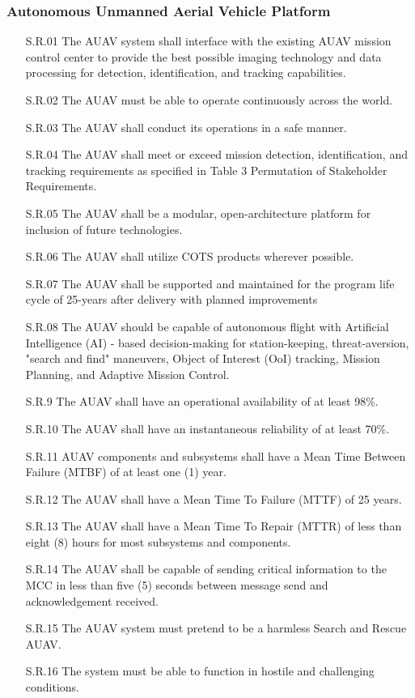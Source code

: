 \begin{fullwidth}
    \subsubsection*{Autonomous Unmanned Aerial Vehicle Platform}
    \begin{enumerate}
        \item[S.R.01]{The AUAV system shall interface with the existing AUAV mission control center to provide the best possible imaging technology and data processing for detection, identification, and tracking capabilities.}
        \item[S.R.02]{The AUAV must be able to operate continuously across the world.}
        \item[S.R.03]{The AUAV shall conduct its operations in a safe manner.}
        \item[S.R.04]{The AUAV shall meet or exceed mission detection, identification, and tracking requirements as specified in Table 3 Permutation of Stakeholder Requirements.}
        \item[S.R.05]{The AUAV shall be a modular, open-architecture platform for inclusion of future technologies.}
        \item[S.R.06]{The AUAV shall utilize COTS products wherever possible.}
        \item[S.R.07]{The AUAV shall be supported and maintained for the program life cycle of 25-years after delivery with planned improvements}
        \item[S.R.08]{The AUAV should be capable of autonomous flight with Artificial Intelligence (AI) - based decision-making for station-keeping, threat-aversion, "search and find" maneuvers, Object of Interest (OoI) tracking, Mission Planning, and Adaptive Mission Control.}
        \item[S.R.9]{The AUAV shall have an operational availability of at least 98\%.}
        \item[S.R.10]{The AUAV shall have an instantaneous reliability of at least 70\%.}
        \item[S.R.11]{AUAV components and subsystems shall have a Mean Time Between Failure (MTBF) of at least one (1) year.}
        \item[S.R.12]{The AUAV shall have a Mean Time To Failure (MTTF) of 25 years.}
        \item[S.R.13]{The AUAV shall have a Mean Time To Repair (MTTR) of less than eight (8) hours for most subsystems and components.}
        \item[S.R.14]{The AUAV shall be capable of sending critical information to the MCC in less than five (5) seconds between message send and acknowledgement received.}
        \item[S.R.15]{The AUAV system must pretend to be a harmless Search and Rescue AUAV.}
        \item[S.R.16]{The system must be able to function in hostile and challenging conditions.}
    \end{enumerate}

\end{fullwidth}
